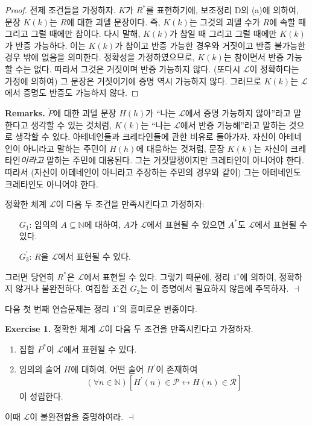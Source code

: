 \documentclass[12pt]{paper}
\newenvironment{context}[1][]{\noindent \textbf{{#1}.}}{\hfill $ \dashv $}
\begin{document}
  \begin{proof}
    전제 조건들을 가정하자.
    $K$가 $R^{*}$를 표현하기에, 보조정리 D의 (a)에 의하여,
    문장 $K \left( k \right)$는 $R$에 대한 괴델 문장이다.
    즉, $K \left( k \right)$는 그것의 괴델 수가 $R$에 속할 때 그리고 그럴 때에만 참이다.
    다시 말해, $K \left( k \right)$가 참일 때 그리고 그럴 때에만 $K \left( k \right)$가 반증 가능하다.
    이는 $K \left( k \right)$가 참이고 반증 가능한 경우와 거짓이고 반증 불가능한 경우 밖에 없음을 의미한다.
    정확성을 가정하였으므로, $K \left( k \right)$는 참이면서 반증 가능할 수는 없다.
    따라서 그것은 거짓이며 반증 가능하지 않다.
    (또다시 $\mathcal{L}$이 정확하다는 가정에 의하여) 그 문장은 거짓이기에 증명 역시 가능하지 않다.
    그러므로 $K \left( k \right)$는 $\mathcal{L}$에서 증명도 반증도 가능하지 않다.
  \end{proof}

  \begin{context}[Remarks]
    $\tilde{P}$에 대한 괴델 문장 $H \left( h \right)$가 ``나는 $\mathcal{L}$에서 증명 가능하지 않아''라고 말한다고 생각할 수 있는 것처럼,
    $K \left( k \right)$는 ``나는 $\mathcal{L}$에서 반증 가능해''라고 말하는 것으로 생각할 수 있다.
    아테네인들과 크레타인들에 관한 비유로 돌아가자.
    자신이 아테네인이 아니라고 말하는 주민이 $H \left( h \right)$에 대응하는 것처럼,
    문장 $K \left( k \right)$는 자신이 크레타인\textit{이라고} 말하는 주민에 대응된다.
    그는 거짓말쟁이지만 크레타인이 아니어야 한다.
    따라서 (자신이 아테네인이 아니라고 주장하는 주민의 경우와 같이) 그는 아테네인도 크레타인도 아니어야 한다.

    정확한 체계 $\mathcal{L}$이 다음 두 조건을 만족시킨다고 가정하자:
    \begin{itemize}
      \item[$G_{1}$:] 임의의 $A \subseteq \mathbb{N}$에 대하여, $A$가 $\mathcal{L}$에서 표현될 수 있으면 $A^{*}$도 $\mathcal{L}$에서 표현될 수 있다.
      \item[$G_{3}^{\prime}$:] $R$을 $\mathcal{L}$에서 표현될 수 있다.
    \end{itemize}

    그러면 당연히 $R^{*}$은 $\mathcal{L}$에서 표현될 수 있다.
    그렇기 때문에, 정리 $1^{\circ}$에 의하여, 정확하지 않거나 불완전하다.
    여집합 조건 $G_{2}$는 이 증명에서 필요하지 않음에 주목하자.
  \end{context}

  다음 첫 번째 연습문제는 정리 $1^{\circ}$의 흥미로운 변종이다.

  \begin{context}[Exercise 1]
    정확한 체계 $\mathcal{L}$이 다음 두 조건을 만족시킨다고 가정하자.
    \begin{enumerate}
      \item 집합 $P^{*}$이 $\mathcal{L}$에서 표현될 수 있다.
      \item 임의의 술어 $H$에 대하여, 어떤 술어 $H^{\prime}$이 존재하여 $$\left( \forall n \in \mathbb{N} \right) \left[ H^{\prime} \left( n \right) \in \mathcal{P} \leftrightarrow H \left( n \right) \in \mathcal{R} \right]$$이 성립한다.
    \end{enumerate}

    이때 $\mathcal{L}$이 불완전함을 증명하여라.
  \end{context}
\end{document}
